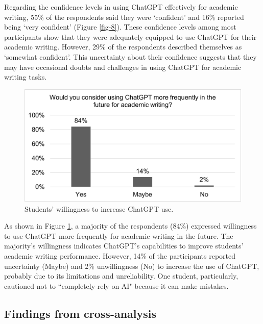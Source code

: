 \documentclass[english]{textolivre}
\begin{document}
Regarding the confidence levels in using ChatGPT effectively for academic writing, 55\% of the respondents said they were ‘confident’ and 16\% reported being ‘very confident’ (Figure \ref{fig-8}). These confidence levels among most participants show that they were adequately equipped to use ChatGPT for their academic writing. However, 29\% of the respondents described themselves as ‘somewhat confident’. This uncertainty about their confidence suggests that they may have occasional doubts and challenges in using ChatGPT for academic writing tasks.

\begin{figure}[h!]
    \centering
    \begin{minipage}{0.80\linewidth}
    \includegraphics[width=\linewidth]{Imagens/FIGURA9.png}
    \caption{Students’ willingness to increase ChatGPT use.}
    \label{fig-9}
    \end{minipage}
\end{figure}

As shown in Figure \ref{fig-9}, a majority of the respondents (84\%) expressed willingness to use ChatGPT more frequently for academic writing in the future. The majority’s willingness indicates ChatGPT’s capabilities to improve students’ academic writing performance. However, 14\% of the participants reported uncertainty (Maybe) and 2\% unwillingness (No) to increase the use of ChatGPT, probably due to its limitations and unreliability. One student, particularly, cautioned not to ``completely rely on AI" because it can make mistakes.

\subsection{Findings from cross-analysis}\label{sec-4_5}
\end{document}
